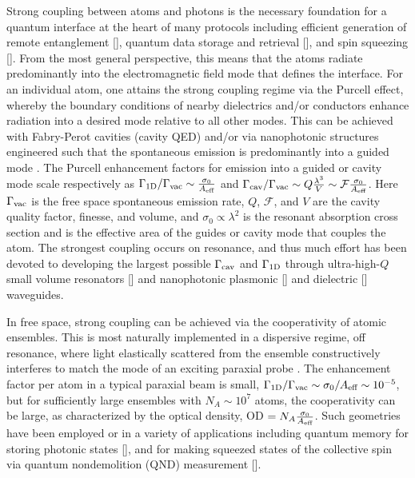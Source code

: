 \documentclass[preprint,aps,pra,onecolumn]{revtex4-1} %
\newcommand{\oneD}{{\rm 1D}}
\newcommand{\vac}{{\rm vac}}
\newcommand{\cav}{{\rm cav}}
\begin{document}
Strong coupling between atoms and photons is the necessary foundation for a quantum interface at the 
heart of many protocols including efficient generation of remote entanglement [], quantum data storage 
and retrieval [], and  spin squeezing []. From the most general perspective, this means that the atoms 
radiate predominantly into the electromagnetic field mode that defines the interface.  For an 
individual atom, one attains the strong coupling regime via the Purcell effect, whereby the boundary 
conditions of nearby dielectrics and/or conductors enhance radiation into a desired mode relative to all 
other modes.  This can be achieved with Fabry-Perot cavities (cavity QED) \cite{} and/or via nanophotonic structures engineered such that the spontaneous emission is predominantly into a guided mode \cite{manga_rao_single_2007,hakuta_manipulating_2012, hung_trapped_2013}.  The Purcell enhancement factors for emission into a guided or cavity mode scale respectively as  $ \Gamma_{\oneD}/\Gamma_{\vac} \sim \frac{\sigma_0}{A_{\eff}}$ and  
$\Gamma_{\cav}/\Gamma_{\vac} \sim   Q \frac{\lambda^3}{V}\sim \mathcal{F}  \frac{\sigma_0}{A_{\eff}}$.  
Here $\Gamma_{\vac}$ is the free space spontaneous emission rate, $Q$, $\mathcal{F}$, and $V$ are the cavity quality factor, finesse, and volume, and $\sigma_0 \propto \lambda^2$ is the resonant absorption cross 
section and is the effective area of the guides or cavity mode that couples the atom.  The strongest 
coupling occurs on resonance, and thus much effort has been devoted to developing the largest possible 
$\Gamma_{\cav}$ and $\Gamma_{\oneD}$ through ultra-high-$Q$ small volume resonators [] and 
nanophotonic plasmonic [] and dielectric [] waveguides.  

In free space, strong coupling can be achieved via the cooperativity of atomic ensembles.  This is most 
naturally implemented in a dispersive regime, off resonance, where light elastically scattered 
from the ensemble constructively interferes to match the mode of an exciting paraxial probe \cite{baragiola_three-dimensional_2014}.  The enhancement factor per atom in a typical paraxial beam is small, $\Gamma_{\oneD}/\Gamma_{\vac} \sim \sigma_0/A_{\eff}  \sim 10^{-5}$, but for sufficiently large ensembles with $N_A \sim  10^7$ atoms, the cooperativity can be large, as characterized by the optical density, OD $= N_A \frac{\sigma_0}{A_{\text{eff}}}$.  Such geometries have been employed or in a variety of applications including quantum memory for storing photonic states [], and for  making squeezed states of the collective spin via quantum nondemolition (QND) measurement [].   
\end{document}
